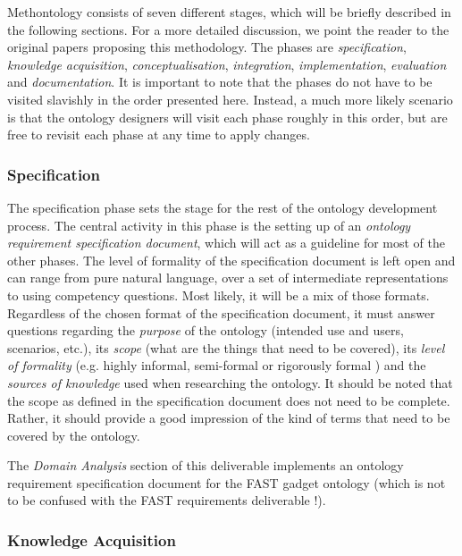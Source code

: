 \documentclass{article}
\begin{document}
Methontology consists of seven different stages, which will be briefly described in the following sections. For a more detailed discussion, we point the reader to the original papers proposing this methodology. The phases are \emph{specification}, \emph{knowledge acquisition}, \emph{conceptualisation}, \emph{integration}, \emph{implementation}, \emph{evaluation} and \emph{documentation}. It is important to note that the phases do not have to be visited slavishly in the order presented here. Instead, a much more likely scenario is that the ontology designers will visit each phase roughly in this order, but are free to revisit each phase at any time to apply changes.

\subsubsection{Specification} %
\label{ssub:specification}

The specification phase sets the stage for the rest of the ontology development process. The central activity in this phase is the setting up of an \emph{ontology requirement specification document}, which will act as a guideline for most of the other phases. The level of formality of the specification document is left open and can range from pure natural language, over a set of intermediate representations to using competency questions. Most likely, it will be a mix of those formats. Regardless of the chosen format of the specification document, it must answer questions regarding the \emph{purpose} of the ontology (intended use and users, scenarios, etc.), its \emph{scope} (what are the things that need to be covered), its \emph{level of formality} (e.g. highly informal, semi-formal or rigorously formal \cite{uschold1996ontologies}) and the \emph{sources of knowledge} used when researching the ontology. It should be noted that the scope as defined in the specification document does not need to be complete. Rather, it should provide a good impression of the kind of terms that need to be covered by the ontology.

The \emph{Domain Analysis} section of this deliverable implements an ontology requirement specification document for the FAST gadget ontology (which is not to be confused with the FAST requirements deliverable \cite{villoslada2010fast_requirements}!).

\subsubsection{Knowledge Acquisition} %
\label{ssub:knowledge_acquisition}
\end{document}
